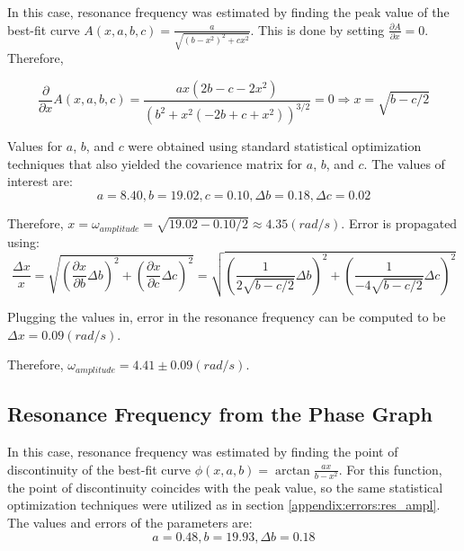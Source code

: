In this case, resonance frequency was estimated by finding the peak value of the best-fit curve $A(x, a, b, c) = \frac{a}{\sqrt{(b-x^2)^2 + cx^2}}$. This is done by setting $\frac{\partial A}{\partial x} = 0$. Therefore,

\begin{equation*}
  \frac{\partial}{\partial x} A(x, a, b, c) = \frac{ax(2b-c-2x^2)}{( b^2 + x^2 (-2b + c + x^2) )^{3/2}} = 0 \Rightarrow x = \sqrt{b - c/2}
\end{equation*}

Values for $a$, $b$, and $c$ were obtained using standard statistical optimization techniques that also yielded the covarience matrix for $a$, $b$, and $c$. The values of interest are:
\begin{equation*}
  a = 8.40, b = 19.02, c = 0.10, \Delta b = 0.18, \Delta c = 0.02
\end{equation*}

Therefore, $x = \omega_{amplitude} = \sqrt{19.02 - 0.10 /2} \approx 4.35 (rad/s)$. Error is propagated using:
\begin{equation*}
  \frac{\Delta x}{x} = \sqrt{ \left( \frac{\partial x}{\partial b} \Delta b \right)^2 + \left( \frac{\partial x}{\partial c} \Delta c \right)^2} = \sqrt{ \left( \frac{1}{2\sqrt{b - c/2}} \Delta b \right)^2 + \left( \frac{1}{-4\sqrt{b-c/2}} \Delta c \right)^2} 
\end{equation*}

Plugging the values in, error in the resonance frequency can be computed to be $\Delta x = 0.09 (rad/s)$.

Therefore, $\omega_{amplitude} = 4.41 \pm 0.09 (rad/s)$.

\subsection{ Resonance Frequency from the Phase Graph } \label{appendix:errors:res_phase}

In this case, resonance frequency was estimated by finding the point of discontinuity of the best-fit curve $\phi(x, a, b) = \arctan \frac{ax}{b - x^2}$. For this function, the point of discontinuity coincides with the peak value, so the same statistical optimization techniques were utilized as in section \ref{appendix:errors:res_ampl}. The values and errors of the parameters are:
\begin{equation*}
  a=0.48, b = 19.93, \Delta b = 0.18
\end{equation*}

